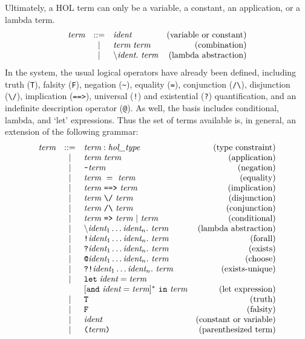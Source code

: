 \documentclass[12pt,fleqn,a4paper]{report}
\makeatletter
\newcommand{\ident}      {\mbox{\it ident}}
\newcommand{\type}       {\mbox{\it hol\_type}}
\newcommand{\term}       {\mbox{\it term}}
\newcommand{\bs}         {\mbox{$\backslash$}}
\newcommand{\IMP}       {\mbox{\tt ==>}}
\newcommand{\LET}       {\mbox{\tt let}}
\newcommand{\IN}       {\mbox{\tt in}}
\newcommand{\und}       {\mbox{\tt and}}
\newcommand{\ALL}       {\mbox{\tt !}}
\newcommand{\EXISTS}       {\mbox{\tt ?}}
\newcommand{\EXISTSONE}       {\mbox{\tt ?!}}
\newcommand{\CHOOSE}       {\mbox{\tt @}}
\makeatother
\begin{document}
Ultimately, a HOL term can only be a variable, a constant, an
application, or a lambda term.
\[
\begin{array}{rclr}
  \term & ::= & \ident & \mbox{(variable or constant)} \\
  & | &  \term\  \term & \mbox{(combination)} \\
  & | &  \bs\ident.\  \term &
  \mbox{(lambda abstraction)}
\end{array}
\]
In the system, the usual logical operators have already been defined,
including truth (\verb+T+), falsity (\verb+F+), negation (\verb+~+),
equality (\verb+=+), conjunction (\verb+/\+), disjunction (\verb+\/+),
implication (\verb+==>+), universal (\verb+!+) and existential
(\verb+?+) quantification, and an indefinite description operator
(\verb+@+). As well, the basis includes conditional, lambda, and `let'
expressions. Thus the set of terms available is, in general, an
extension of the following grammar:
\[
\begin{array}{rclr}
  \mbox{\it term} & ::= & \term : \type & \mbox{(type constraint)} \\
  & | & \term\ \term & \mbox{(application)} \\
  & | & \verb+~+ \term & \mbox{(negation)} \\
  & | & \term\ =\ \term & \mbox{(equality)} \\
  & | & \term\ \IMP\ \term & \mbox{(implication)} \\
  & | & \term\ \verb+\/+\ \term & \mbox{(disjunction)} \\
  & | & \term\ \verb+/\+\ \term & \mbox{(conjunction)} \\
  & | & \term\ \verb+=>+\ \term\ |\ \term & \mbox{(conditional)} \\
  & | & \bs\ident_1\ldots\ident_n.\  \term & \mbox{(lambda abstraction)} \\
  & | & \ALL \ident_1\ldots\ident_n.\ \term & \mbox{(forall)} \\
  & | & \EXISTS \ident_1\ldots\ident_n.\ \term & \mbox{(exists)} \\
  & | & \CHOOSE \ident_1\ldots\ident_n.\ \term & \mbox{(choose)} \\
  & | & \EXISTSONE \ident_1\ldots\ident_n.\ \term &\mbox{(exists-unique)} \\
  & | & \LET\; \ident = \term  & \\
  &   & [\und\ \ident = \term]^{*}\ \IN\ \term & \mbox{(let expression)} \\
  & | & \verb+T+ & \mbox{(truth)} \\
  & | & \verb+F+ & \mbox{(falsity)} \\
  & | & \ident & \mbox{(constant or variable)} \\
  & | & \verb+(+ \term \verb+)+ & \mbox{(parenthesized term)}
\end{array}
\]
\end{document}
